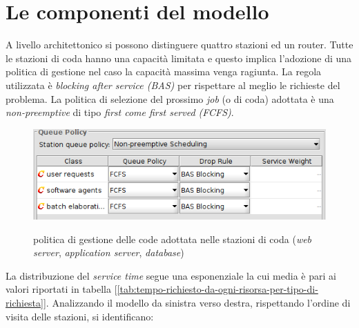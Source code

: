 \documentclass[../main.tex]{subfiles}
\begin{document}
    \section{Le componenti del modello}\label{sec:le-componenti-del-modello}
    A livello architettonico si possono distinguere quattro stazioni ed un router.
    Tutte le stazioni di coda hanno una capacità limitata e questo implica l'adozione di una politica di gestione nel
    caso la capacità massima venga ragiunta.
    La regola utilizzata è \textit{blocking after service (BAS)} per rispettare al meglio le richieste del problema.
    La politica di selezione del prossimo \textit{job} (o di coda) adottata è una  \textit{non-preemptive} di tipo \textit{first come first served (FCFS)}.
    \begin{figure}[H]
        \centering
        \includegraphics[scale = 0.5]{assets/queue_policy.png}\\
        \caption[\textit{Politica} di gestione delle code]{ politica di gestione delle code adottata nelle stazioni di coda (\textit{web server}, \textit{application server}, \textit{database})}
        \label{fig:politica-di-coda}
    \end{figure}
    La distribuzione del \textit{service time} segue una esponenziale la cui media è pari ai valori riportati in tabella [\ref{tab:tempo-richiesto-da-ogni-risorsa-per-tipo-di-richiesta}].
    Analizzando il modello da sinistra verso destra, rispettando l'ordine di visita delle stazioni, si identificano:
\end{document}

